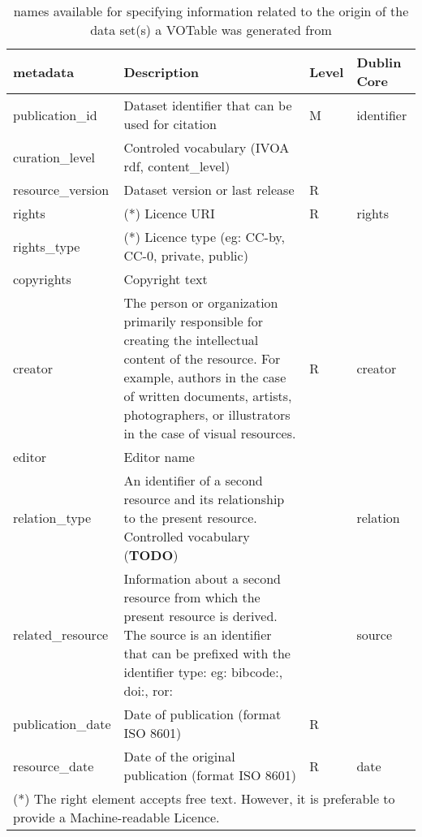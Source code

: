 \documentclass[11pt,a4paper]{ivoa}
\begin{document}
\begin{table}
\begin{tabular}{|l|p{5cm}|l|l|}  \hline
\textbf{metadata} & \textbf{Description} & \textbf{Level} & \textbf{Dublin Core}\\ \hline
publication\_id    & Dataset identifier that can be used for citation& M  & identifier\\ \hline
curation\_level    & Controled vocabulary
                   (IVOA rdf, content\_level) &  &  \\ \hline
resource\_version  & Dataset version or last release & R & \\ \hline
rights             & (*) Licence URI & R & rights\\ \hline
rights\_type       & (*) Licence type (eg: CC-by, CC-0, private, public) &  &  \\ \hline
copyrights         & Copyright text &  & \\ \hline
creator            & The person or organization primarily responsible for creating the
                     intellectual content of the resource.  For example, authors in the
                     case of written documents, artists, photographers, or illustrators in
                     the case of visual resources. & R & creator\\ \hline
editor             & Editor name &  & \\ \hline
relation\_type     & An identifier of a second resource and its relationship to the
                     present resource.
                     Controlled vocabulary (\textbf{TODO}) & & relation\\ \hline
related\_resource  & Information about a second resource from which the present resource
                     is derived. The source is an identifier that can be prefixed with the identifier type: eg: bibcode:, doi:, ror: &  & source\\ \hline
publication\_date  & Date of publication (format ISO 8601) &  R &  \\ \hline
resource\_date     & Date of the original publication (format ISO 8601) & R & date\\ \hline
\multicolumn{4}{p{\textwidth}}{\footnotesize(*) The right element	accepts free
text. However,	it is preferable to provide	a Machine-readable
Licence.}\\
\end{tabular}
\caption{ names available for specifying information
related to the origin of the data set(s) a VOTable was generated from}
\label{tab:origin-names}
\end{table}
\end{document}
